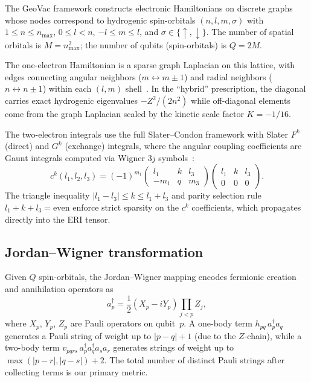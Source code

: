 \documentclass[aps,pra,twocolumn,superscriptaddress,longbibliography]{revtex4-2}
\begin{document}
The GeoVac framework constructs electronic Hamiltonians on discrete graphs
whose nodes correspond to hydrogenic spin-orbitals $(n, l, m, \sigma)$
with $1 \le n \le n_{\max}$, $0 \le l < n$, $-l \le m \le l$, and
$\sigma \in \{\uparrow, \downarrow\}$.  The number of spatial orbitals is
$M = n_{\max}^2$; the number of qubits (spin-orbitals) is $Q = 2M$.

The one-electron Hamiltonian is a sparse graph Laplacian on this lattice,
with edges connecting angular neighbors ($m \leftrightarrow m \pm 1$) and
radial neighbors ($n \leftrightarrow n \pm 1$) within each $(l, m)$
shell~\cite{loutey_paper7}.  In the ``hybrid'' prescription, the diagonal
carries exact hydrogenic eigenvalues $-Z^2/(2n^2)$ while off-diagonal
elements come from the graph Laplacian scaled by the kinetic scale
factor $K = -1/16$.

The two-electron integrals use the full Slater--Condon framework with
Slater $F^k$ (direct) and $G^k$ (exchange) integrals, where the angular
coupling coefficients are Gaunt integrals computed via Wigner $3j$
symbols~\cite{loutey_paper13}:
\begin{equation}
  c^k(l_1, l_2, l_3) = (-1)^{m_1}
  \begin{pmatrix} l_1 & k & l_3 \\ -m_1 & q & m_3 \end{pmatrix}
  \begin{pmatrix} l_1 & k & l_3 \\ 0 & 0 & 0 \end{pmatrix}.
  \label{eq:gaunt}
\end{equation}
The triangle inequality $|l_1 - l_3| \le k \le l_1 + l_3$ and parity
selection rule $l_1 + k + l_3 = \text{even}$ enforce strict sparsity on
the $c^k$ coefficients, which propagates directly into the ERI tensor.

\subsection{Jordan--Wigner transformation}
\label{sec:jw}

Given $Q$ spin-orbitals, the Jordan--Wigner mapping encodes fermionic
creation and annihilation operators as~\cite{jordan1928}
\begin{equation}
  a^\dagger_p = \frac{1}{2}(X_p - iY_p) \prod_{j<p} Z_j,
  \label{eq:jw}
\end{equation}
where $X_p$, $Y_p$, $Z_p$ are Pauli operators on qubit~$p$.  A one-body
term $h_{pq}\, a^\dagger_p a_q$ generates a Pauli string of weight up to
$|p - q| + 1$ (due to the $Z$-chain), while a two-body term
$v_{pqrs}\, a^\dagger_p a^\dagger_q a_s a_r$ generates strings of weight
up to $\max(|p-r|, |q-s|) + 2$.  The total number of distinct Pauli
strings after collecting terms is our primary metric.
\end{document}
